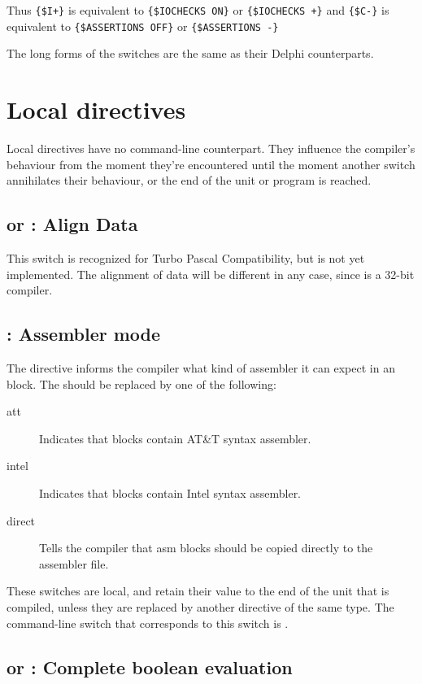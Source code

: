 \documentclass{report}
\begin{document}
Thus \verb|{$I+}| is equivalent to \verb|{$IOCHECKS ON}| or 
\verb|{$IOCHECKS +}| and 
\verb|{$C-}| is equivalent to \verb|{$ASSERTIONS OFF}| or
\verb|{$ASSERTIONS -}|

The long forms of the switches are the same as their Delphi 
counterparts.

\section{Local directives}
\label{se:LocalSwitch}
Local directives have no command-line counterpart. They influence the
compiler's behaviour from the moment they're encountered until the moment
another switch annihilates their behaviour, or the end of the unit or
program is reached.

\subsection{ or : Align Data}

This switch is recognized for Turbo Pascal Compatibility, but is not
yet implemented. The alignment of data will be different in any case, since
\fpc is a 32-bit compiler.

\subsection{ : Assembler mode}
\label{se:AsmReader}

The  directive informs the compiler what kind of assembler 
it can expect in an  block. The  should be replaced by one 
of the following:
\begin{description}
\item [att\ ] Indicates that  blocks contain AT\&T syntax assembler.
\item [intel\ ] Indicates that  blocks contain Intel syntax
assembler.
\item [direct\ ] Tells the compiler that asm blocks should be copied
directly to the assembler file.
\end{description}
These switches are local, and retain their value to the end of the unit that
is compiled, unless they are replaced by another directive of the same type.
The command-line switch that corresponds to this switch is .

\subsection{ or : Complete boolean evaluation}
\end{document}
